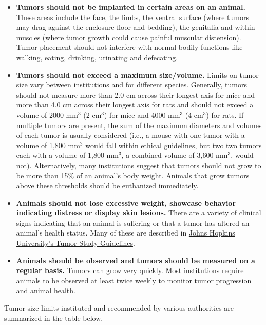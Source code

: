\documentclass[letterpaper, 12pt]{article}
\begin{document}
\begin{itemize}
    \setlength\itemsep{-0.5em}
    \item \textbf{Tumors should not be implanted in certain areas on an animal.} These areas include the face, the limbs, the ventral surface (where tumors may drag against the enclosure floor and bedding), the genitalia and within muscles (where tumor growth could cause painful muscular distension). Tumor placement should not interfere with normal bodily functions like walking, eating, drinking, urinating and defecating.
    \item \textbf{Tumors should not exceed a maximum size/volume.} Limits on tumor size vary between institutions and for different species. Generally, tumors should not measure more than 2.0 cm across their longest axis for mice and more than 4.0 cm across their longest axis for rats and should not exceed a volume of 2000 mm$^3$ (2 cm$^3$) for mice and 4000 mm$^3$ (4 cm$^3$) for rats. If multiple tumors are present, the sum of the maximum diameters and volumes of each tumor is usually considered (i.e., a mouse with one tumor with a volume of 1,800 mm$^3$ would fall within ethical guidelines, but two two tumors each with a volume of 1,800 mm$^3$, a combined volume of 3,600 mm$^3$, would not). Alternatively, many institutions suggest that tumors should not grow to be more than 15\% of an animal's body weight. Animals that grow tumors above these thresholds should be euthanized immediately.
    \item \textbf{Animals should not lose excessive weight, showcase behavior indicating distress or display skin lesions.} There are a variety of clinical signs indicating that an animal is suffering or that a tumor has altered an animal's health status. Many of these are described in \href{https://animalcare.jhu.edu/wp-content/uploads/sites/5/Tumor-Study-Guidelines-in-Mice-and-Rats.pdf}{Johns Hopkins University's Tumor Study Guidelines}.
    \item \textbf{Animals should be observed and tumors should be measured on a regular basis.} Tumors can grow very quickly. Most institutions require animals to be observed at least twice weekly to monitor tumor progression and animal health.
\end{itemize}

Tumor size limits instituted and recommended by various authorities are summarized in the table below.
\end{document}
